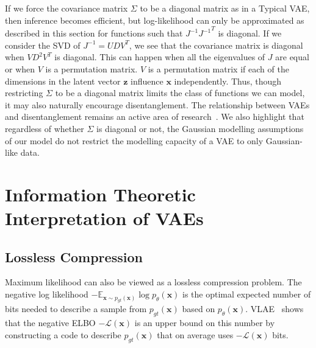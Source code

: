 \documentclass{article}
\begin{document}
If we force the covariance matrix $\Sigma$ to be a diagonal matrix as in  a Typical VAE, then inference becomes efficient, but log-likelihood can only be approximated as described in this section for functions such that $J^{-1} {J^{-1}}^T$ is diagonal. If we consider the SVD of $J^{-1} = UDV^T$, we see that the covariance matrix is diagonal when $VD^2V^T$ is diagonal.
This can happen when all the eigenvalues of $J$ are equal or when $V$ is a permutation matrix. $V$ is a permutation matrix if each of the dimensions in the latent vector $\mathbf{z}$ influence $\mathbf{x}$ independently.
Thus, though restricting $\Sigma$ to be a diagonal matrix limits the class of functions we can model, it may also naturally encourage disentanglement. 
The relationship between VAEs and disentanglement remains an active area of research~\cite{betavae,chen2018isolating}.
We also highlight that regardless of whether $\Sigma$ is diagonal or not, the Gaussian modelling assumptions of our model do not restrict the modelling capacity of a VAE to only Gaussian-like data.

\section{Information Theoretic Interpretation of VAEs}
\label{sec:information}

\subsection{Lossless Compression}
\label{sec:lossless}

Maximum likelihood can also be viewed as a lossless compression problem.
The negative log likelihood $- \mathbb{E}_{\mathbf{x} \sim p_{gt}(\mathbf{x})} \log p_\theta(\mathbf{x}) $ is the optimal expected number of bits needed to describe a sample from $p_{gt}(\mathbf{x})$ based on $p_\theta(\mathbf{x})$.
VLAE~\cite{vlae} shows that the negative ELBO $-\mathcal{L}(\mathbf{x})$ is an upper bound on this number by constructing a code to describe $p_{gt}(\mathbf{x})$ that on average uses $-\mathcal{L}(\mathbf{x})$ bits.
\end{document}
